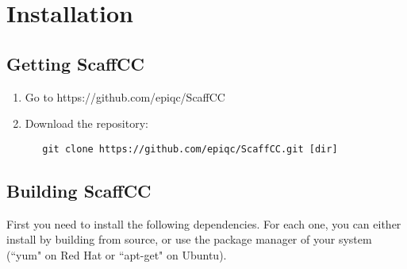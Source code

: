 \chapter{Installation}\label{ch:inst}

\section{Getting ScaffCC}
\begin{enumerate}
  \item Go to https://github.com/epiqc/ScaffCC
  \item Download the repository:
\begin{lstlisting}
   git clone https://github.com/epiqc/ScaffCC.git [dir]
\end{lstlisting}
\end{enumerate}


\section{Building ScaffCC}
First you need to install the following dependencies. For each one, you can either install by building from source,
or use the package manager of your system (``yum" on Red Hat or ``apt-get" on Ubuntu).  

